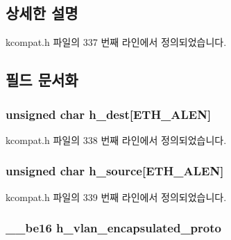 \subsection{상세한 설명}


kcompat.\+h 파일의 337 번째 라인에서 정의되었습니다.



\subsection{필드 문서화}
\subsubsection[{\texorpdfstring{h\+\_\+dest}{h_dest}}]{\setlength{\rightskip}{0pt plus 5cm}unsigned char h\+\_\+dest\mbox{[}{\bf E\+T\+H\+\_\+\+A\+L\+EN}\mbox{]}}\hypertarget{struct__kc__vlan__ethhdr_a4ed9730824f0fec5b744ab5c58090101}{}\label{struct__kc__vlan__ethhdr_a4ed9730824f0fec5b744ab5c58090101}


kcompat.\+h 파일의 338 번째 라인에서 정의되었습니다.

\subsubsection[{\texorpdfstring{h\+\_\+source}{h_source}}]{\setlength{\rightskip}{0pt plus 5cm}unsigned char h\+\_\+source\mbox{[}{\bf E\+T\+H\+\_\+\+A\+L\+EN}\mbox{]}}\hypertarget{struct__kc__vlan__ethhdr_a97dd3055fe7dd35d5e54aced21ed67d3}{}\label{struct__kc__vlan__ethhdr_a97dd3055fe7dd35d5e54aced21ed67d3}


kcompat.\+h 파일의 339 번째 라인에서 정의되었습니다.

\subsubsection[{\texorpdfstring{h\+\_\+vlan\+\_\+encapsulated\+\_\+proto}{h_vlan_encapsulated_proto}}]{\setlength{\rightskip}{0pt plus 5cm}\+\_\+\+\_\+be16 h\+\_\+vlan\+\_\+encapsulated\+\_\+proto}\hypertarget{struct__kc__vlan__ethhdr_a36530e176eb1042729f476437cde0790}{}\label{struct__kc__vlan__ethhdr_a36530e176eb1042729f476437cde0790}


